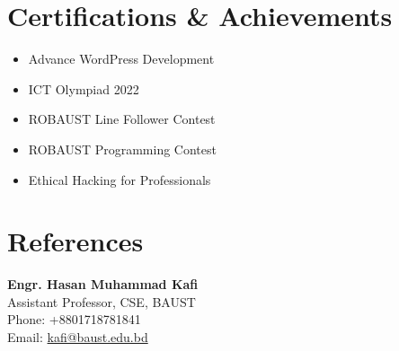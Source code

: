 \documentclass[a4paper,10pt]{article}
\begin{document}
\begin{multicols}{2}
\begin{flushleft}
        \section*{Certifications \& Achievements}
        \begin{itemize}[left=0em, labelsep=1em, label=\textbullet, itemsep=0.2em]
            \item Advance WordPress Development
            \item ICT Olympiad 2022
            \item ROBAUST Line Follower Contest
            \item ROBAUST Programming Contest
            \item Ethical Hacking for Professionals
        \end{itemize}

        \section*{References}
        \noindent \textbf{Engr. Hasan Muhammad Kafi} \\
        Assistant Professor, CSE, BAUST \\
        Phone: +8801718781841 \\
        Email: \href{mailto:kafi@baust.edu.bd}{kafi@baust.edu.bd}
    \end{flushleft}
\end{multicols}
\end{document}
